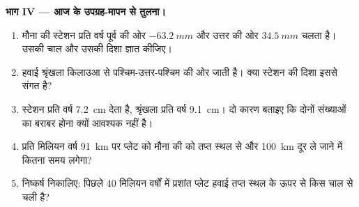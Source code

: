 \begin{problem}[{सप्ताहांत समस्या --- ज्वालामुखियों में लिखी एक प्लेट की चाल}]
\medskip
\noindent\textbf{भाग IV --- आज के उपग्रह-मापन से तुलना।}
\begin{enumerate}[resume]
  \item मौना की स्टेशन प्रति वर्ष पूर्व की ओर $\qty{-63.2}{mm}$ और
        उत्तर की ओर $\qty{+34.5}{mm}$ चलता है। उसकी चाल और उसकी दिशा ज्ञात कीजिए।
  \item हवाई श्रृंखला किलाउआ से पश्चिम-उत्तर-पश्चिम की ओर जाती है। क्या
        स्टेशन की दिशा इससे संगत है?
  \item स्टेशन प्रति वर्ष \qty{7.2}{cm} देता है, श्रृंखला प्रति वर्ष \qty{9.1}{cm}।
        दो कारण बताइए कि दोनों संख्याओं का बराबर होना क्यों आवश्यक नहीं है।
  \item प्रति मिलियन वर्ष \qty{91}{km} पर प्लेट को मौना की को तप्त स्थल से
        और \qty{100}{km} दूर ले जाने में कितना समय लगेगा?
  \item निष्कर्ष निकालिए: पिछले 40 मिलियन वर्षों में प्रशांत प्लेट हवाई
        तप्त स्थल के ऊपर से किस चाल से चली है?
\end{enumerate}
\end{problem}
